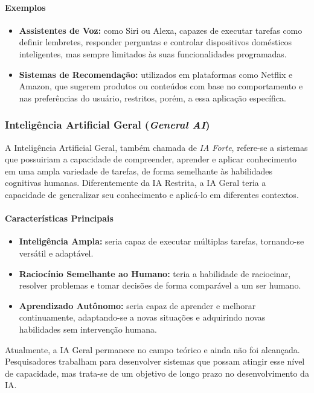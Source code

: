 \paragraph{Exemplos}
\begin{itemize}
    \item \textbf{Assistentes de Voz:} como Siri ou Alexa, capazes de executar tarefas como definir lembretes, responder perguntas e controlar dispositivos domésticos inteligentes, mas sempre limitados às suas funcionalidades programadas.
    \item \textbf{Sistemas de Recomendação:} utilizados em plataformas como Netflix e Amazon, que sugerem produtos ou conteúdos com base no comportamento e nas preferências do usuário, restritos, porém, a essa aplicação específica.
\end{itemize}

\subsubsection{Inteligência Artificial Geral (\emph{General AI})}

A Inteligência Artificial Geral, também chamada de \emph{IA Forte}, refere-se a sistemas que possuiriam a capacidade de compreender, aprender e aplicar conhecimento em uma ampla variedade de tarefas, de forma semelhante às habilidades cognitivas humanas. Diferentemente da IA Restrita, a IA Geral teria a capacidade de generalizar seu conhecimento e aplicá-lo em diferentes contextos.

\paragraph{Características Principais}
\begin{itemize}
    \item \textbf{Inteligência Ampla:} seria capaz de executar múltiplas tarefas, tornando-se versátil e adaptável.
    \item \textbf{Raciocínio Semelhante ao Humano:} teria a habilidade de raciocinar, resolver problemas e tomar decisões de forma comparável a um ser humano.
    \item \textbf{Aprendizado Autônomo:} seria capaz de aprender e melhorar continuamente, adaptando-se a novas situações e adquirindo novas habilidades sem intervenção humana.
\end{itemize}

Atualmente, a IA Geral permanece no campo teórico e ainda não foi alcançada. Pesquisadores trabalham para desenvolver sistemas que possam atingir esse nível de capacidade, mas trata-se de um objetivo de longo prazo no desenvolvimento da IA.

